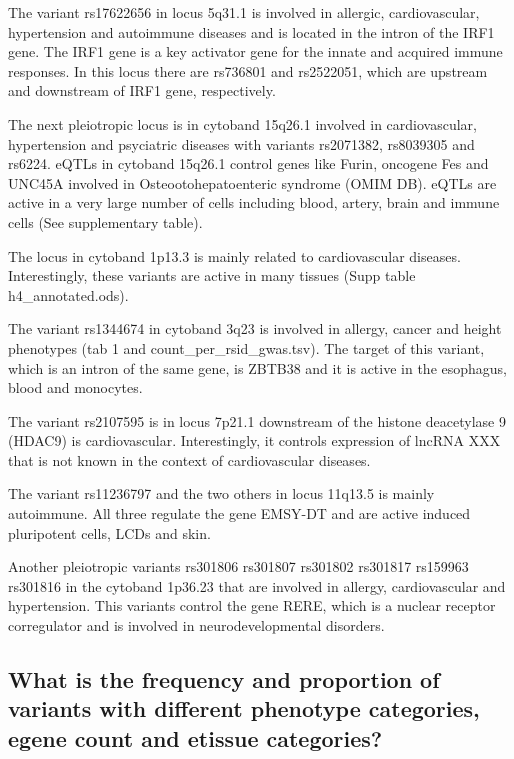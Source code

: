 The variant rs17622656 in locus 5q31.1 is involved in allergic, cardiovascular, hypertension and autoimmune diseases and is located in the intron of the IRF1 gene.
The IRF1 gene is a key activator gene for the innate and acquired immune responses.
In this locus there are rs736801 and rs2522051, which are upstream and downstream of IRF1 gene, respectively.


The next pleiotropic locus is in cytoband 15q26.1 involved in cardiovascular, hypertension and psyciatric diseases with variants rs2071382, rs8039305 and rs6224.
%
eQTLs in cytoband 15q26.1 control genes like Furin, oncogene Fes and UNC45A involved in Osteootohepatoenteric syndrome (OMIM DB).
%
eQTLs are active in a very large number of cells including blood, artery, brain and immune cells (See supplementary table).

The locus in cytoband 1p13.3 is mainly related to cardiovascular diseases.
Interestingly, these variants are active in many tissues (Supp table h4_annotated.ods).

The variant rs1344674 in cytoband 3q23 is involved in allergy, cancer and height phenotypes (tab 1 and count_per_rsid_gwas.tsv).
The target of this variant, which is an intron of the same gene, is ZBTB38 and it is active in the esophagus, blood and monocytes.

The variant rs2107595 is in locus 7p21.1 downstream of the histone deacetylase 9 (HDAC9) is cardiovascular. Interestingly, it controls expression of lncRNA XXX that is not known in the context of cardiovascular diseases.

The variant rs11236797 and the two others in locus 11q13.5 is mainly autoimmune.
All three regulate the gene EMSY-DT and are active induced pluripotent cells, LCDs and skin.

Another pleiotropic variants rs301806
rs301807
rs301802
rs301817
rs159963
rs301816
in the cytoband 1p36.23 that are involved in allergy, cardiovascular and hypertension.
This variants control the gene RERE, which is a nuclear receptor corregulator and is involved in neurodevelopmental disorders.\\

\subsection*{What is the frequency and proportion of variants with different phenotype categories, egene count and etissue categories?}

